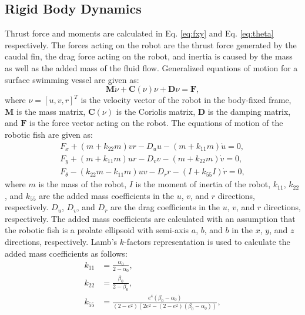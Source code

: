\documentclass[pdflatex,sn-mathphys-num]{sn-jnl}
\theoremstyle{thmstyleone}%
\begin{document}
\subsection{Rigid Body Dynamics}
Thrust force and moments are calculated in Eq. \ref{eq:fxy} and Eq. \ref{eq:theta} respectively. The forces acting on the robot are the thrust force generated by the caudal fin, the drag force acting on the robot, and inertia is caused by the mass as well as the added mass of the fluid flow. Generalized equations of motion for a surface swimming vessel are given as:
\begin{equation}
    \textbf{M}\dot{\nu} + \textbf{C}(\nu)\nu + \textbf{D}\nu = \textbf{F},
\end{equation}
where $\nu = [u, v, r]^T$ is the velocity vector of the robot in the body-fixed frame, $\textbf{M}$ is the mass matrix, $\textbf{C}(\nu)$ is the Coriolis matrix, $\textbf{D}$ is the damping matrix, and $\textbf{F}$ is the force vector acting on the robot. The equations of motion of the robotic fish are given as:
\begin{equation}
    \begin{matrix}
        F_x + (m + k_{22}m)vr - D_u u - (m + k_{11}m)\dot{u} = 0, \\
        F_y + (m + k_{11}m)ur - D_v v - (m + k_{22}m)\dot{v} = 0, \\
        F_\theta - (k_{22}m - k_{11}m)uv - D_r r - (I + k_{55}I) \dot{r} = 0,
        \label{eq:eom}
    \end{matrix}
\end{equation}
where $m$ is the mass of the robot, $I$ is the moment of inertia of the robot, $k_{11}$, $k_{22}$, and $k_{55}$ are the added mass coefficients in the $u$, $v$, and $r$ directions, respectively. $D_u$, $D_v$, and $D_r$ are the drag coefficients in the $u$, $v$, and $r$ directions, respectively. The added mass coefficients are calculated with an assumption that the robotic fish is a prolate ellipsoid with semi-axis $a$, $b$, and $b$ in the $x$, $y$, and $z$ directions, respectively. Lamb's $k$-factors representation is used to calculate the added mass coefficients as follows:
\begin{equation}
    \begin{aligned}
        k_{11} &= \frac{\alpha_0}{2 - \alpha_0}, \\
        k_{22} &= \frac{\beta_0}{2 - \beta_0}, \\
        k_{55} &= \frac{e^4(\beta_0 - \alpha_0)}{(2-e^2)(2e^2 -(2-e^2)(\beta_0 - \alpha_0))},
    \end{aligned}
\end{equation}
\end{document}
